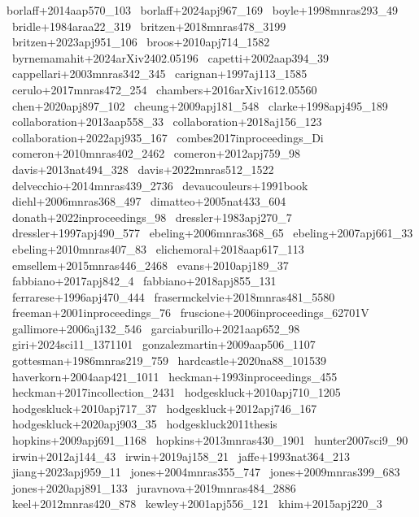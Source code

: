 \documentclass{article}
\begin{document}
\noindent borlaff+2014aap570_103 \
\noindent borlaff+2024apj967_169 \
\noindent boyle+1998mnras293_49 \
\noindent bridle+1984araa22_319 \
\noindent britzen+2018mnras478_3199 \
\noindent britzen+2023apj951_106 \
\noindent broos+2010apj714_1582 \
\noindent byrnemamahit+2024arXiv2402.05196 \
\noindent capetti+2002aap394_39 \
\noindent cappellari+2003mnras342_345 \
\noindent carignan+1997aj113_1585 \
\noindent cerulo+2017mnras472_254 \
\noindent chambers+2016arXiv1612.05560 \
\noindent chen+2020apj897_102 \
\noindent cheung+2009apj181_548 \
\noindent clarke+1998apj495_189 \
\noindent collaboration+2013aap558_33 \
\noindent collaboration+2018aj156_123 \
\noindent collaboration+2022apj935_167 \
\noindent combes2017inproceedings_Di \
\noindent comeron+2010mnras402_2462 \
\noindent comeron+2012apj759_98 \
\noindent davis+2013nat494_328 \
\noindent davis+2022mnras512_1522 \
\noindent delvecchio+2014mnras439_2736 \
\noindent devaucouleurs+1991book \
\noindent diehl+2006mnras368_497 \
\noindent dimatteo+2005nat433_604 \
\noindent donath+2022inproceedings_98 \
\noindent dressler+1983apj270_7 \
\noindent dressler+1997apj490_577 \
\noindent ebeling+2006mnras368_65 \
\noindent ebeling+2007apj661_33 \
\noindent ebeling+2010mnras407_83 \
\noindent elichemoral+2018aap617_113 \
\noindent emsellem+2015mnras446_2468 \
\noindent evans+2010apj189_37 \
\noindent fabbiano+2017apj842_4 \
\noindent fabbiano+2018apj855_131 \
\noindent ferrarese+1996apj470_444 \
\noindent frasermckelvie+2018mnras481_5580 \
\noindent freeman+2001inproceedings_76 \
\noindent fruscione+2006inproceedings_62701V \
\noindent gallimore+2006aj132_546 \
\noindent garciaburillo+2021aap652_98 \
\noindent giri+2024sci11_1371101 \
\noindent gonzalezmartin+2009aap506_1107 \
\noindent gottesman+1986mnras219_759 \
\noindent hardcastle+2020na88_101539 \
\noindent haverkorn+2004aap421_1011 \
\noindent heckman+1993inproceedings_455 \
\noindent heckman+2017incollection_2431 \
\noindent hodgeskluck+2010apj710_1205 \
\noindent hodgeskluck+2010apj717_37 \
\noindent hodgeskluck+2012apj746_167 \
\noindent hodgeskluck+2020apj903_35 \
\noindent hodgeskluck2011thesis \
\noindent hopkins+2009apj691_1168 \
\noindent hopkins+2013mnras430_1901 \
\noindent hunter2007sci9_90 \
\noindent irwin+2012aj144_43 \
\noindent irwin+2019aj158_21 \
\noindent jaffe+1993nat364_213 \
\noindent jiang+2023apj959_11 \
\noindent jones+2004mnras355_747 \
\noindent jones+2009mnras399_683 \
\noindent jones+2020apj891_133 \
\noindent juravnova+2019mnras484_2886 \
\noindent keel+2012mnras420_878 \
\noindent kewley+2001apj556_121 \
\noindent khim+2015apj220_3 \
\end{document}
